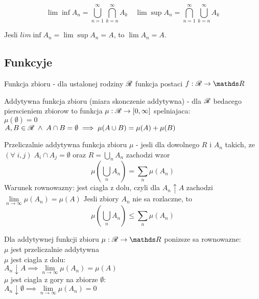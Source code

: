 $$\lim\inf A_n = \bigcup\limits_{n=1}^\infty\bigcap\limits_{k=n}^\infty A_k \quad\lim\sup A_n=\bigcap\limits_{n=1}^\infty\bigcup\limits_{k=n}^\infty A_k$$
\begin{center}
    Jesli $lim\inf A_n=\lim\sup A_n=A$, to $\lim A_n=A$.
\end{center}
\bigskip

\bigskip

\subsection{Funkcyje}

\begin{multicols}{2}
    {\color{def}Funkcja zbioru} - dla ustalonej rodziny $\mathcal{R}$ funkcja postaci $f:\rodz R\to\R$\smallskip

    {\color{def}Addytywna funkcja zbioru} (miara skonczenie addytywna) - dla $\mathcal{R}$ bedacego pierscieniem zbiorow to funkcja $\mu:\mathcal{R}\to [0,\infty]$ spelniajaca:\smallskip\\
    \point $\mu(\emptyset) = 0$\smallskip\\
    \point $A,B\in\mathcal{R}\;\land\;A\cap B=\emptyset\implies \mu(A\cup B)=\mu(A)+\mu(B)$\medskip

    {\color{def}Przeliczalnie addytywna funkcja zbioru} $\mu$ - jesli dla dowolnego $R$ i $A_n$ takich, ze $(\forall\;i,j)\;A_i\cap A_j=\emptyset$ oraz $R=\bigcup\limits_n A_n$ zachodzi wzor
    $$\mu(\bigcup\limits_n A_n)=\sum\limits_n\mu(A_n)$$
    {\color{acc}Warunek rownowazny}: jest ciagla z dolu, czyli dla $A_n\uparrow A$ zachodzi $\lim\limits_{n\to\infty}\mu(A_n)=\mu(A)$
    Jesli zbiory $A_n$ nie sa rozlaczne, to 
    $$\mu(\bigcup\limits_n A_n)\leq\sum\limits_n\mu(A_n)$$

    Dla {\color{def}addytywnej funkcji zbioru} $\mu:\rodz R\to \R$ ponizsze sa {\color{def}rownowazne}:\smallskip\\
    \point $\mu$ jest przeliczalnie addytywna\smallskip\\
    \point $\mu$ jest ciagla z dolu: \\
    \indent\indent $A_n\downarrow A\implies \lim\limits_{n\to\infty}\mu(A_n)=\mu(A)$\smallskip\\
    \point $\mu$ jest ciagla z gory na zbiorze $\emptyset$:\\
    \indent\indent $A_n\downarrow\emptyset\implies\lim\limits_{n\to\infty}\mu(A_n)=0$

\end{multicols}\bigskip

